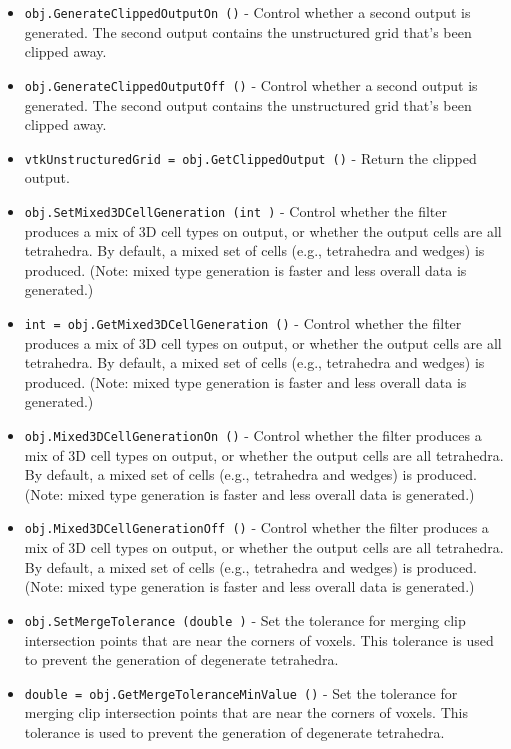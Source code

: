 \begin{itemize}
\item  \verb|obj.GenerateClippedOutputOn ()| -  Control whether a second output is generated. The second output
 contains the unstructured grid that's been clipped away.

\item  \verb|obj.GenerateClippedOutputOff ()| -  Control whether a second output is generated. The second output
 contains the unstructured grid that's been clipped away.

\item  \verb|vtkUnstructuredGrid = obj.GetClippedOutput ()| -  Return the clipped output.

\item  \verb|obj.SetMixed3DCellGeneration (int )| -  Control whether the filter produces a mix of 3D cell types on output, or
 whether the output cells are all tetrahedra. By default, a mixed set of
 cells (e.g., tetrahedra and wedges) is produced. (Note: mixed type
 generation is faster and less overall data is generated.)

\item  \verb|int = obj.GetMixed3DCellGeneration ()| -  Control whether the filter produces a mix of 3D cell types on output, or
 whether the output cells are all tetrahedra. By default, a mixed set of
 cells (e.g., tetrahedra and wedges) is produced. (Note: mixed type
 generation is faster and less overall data is generated.)

\item  \verb|obj.Mixed3DCellGenerationOn ()| -  Control whether the filter produces a mix of 3D cell types on output, or
 whether the output cells are all tetrahedra. By default, a mixed set of
 cells (e.g., tetrahedra and wedges) is produced. (Note: mixed type
 generation is faster and less overall data is generated.)

\item  \verb|obj.Mixed3DCellGenerationOff ()| -  Control whether the filter produces a mix of 3D cell types on output, or
 whether the output cells are all tetrahedra. By default, a mixed set of
 cells (e.g., tetrahedra and wedges) is produced. (Note: mixed type
 generation is faster and less overall data is generated.)

\item  \verb|obj.SetMergeTolerance (double )| -  Set the tolerance for merging clip intersection points that are near
 the corners of voxels. This tolerance is used to prevent the generation
 of degenerate tetrahedra.

\item  \verb|double = obj.GetMergeToleranceMinValue ()| -  Set the tolerance for merging clip intersection points that are near
 the corners of voxels. This tolerance is used to prevent the generation
 of degenerate tetrahedra.


\end{itemize}
